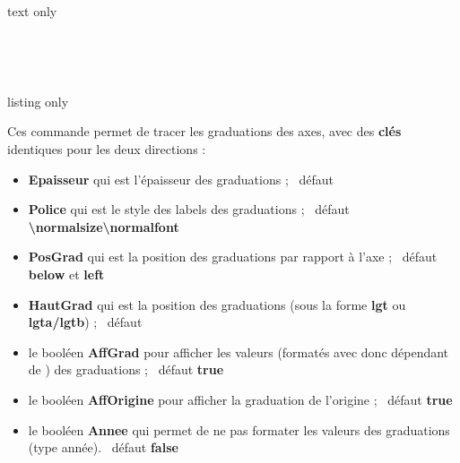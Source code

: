 \documentclass[a4paper,french,11pt]{article}
\newcommand\ctex[1]{\tcbox[vignettelatex]{#1}}
\newcommand\Cle[1]{{\bfseries\sffamily\textlangle #1\textrangle}}
\begin{document}
\begin{PresCodeSortiePL}{text only}
\hfill~
\begin{tikzpicture}%
	[x=0.3cm,y=0.06cm,%
	Ox=1992,xmin=1992,xmax=2012,xgrille=2,xgrilles=1,%
	Oy=1640,ymin=1640,ymax=1730,ygrille=10,ygrilles=5]
	\AxesTikz
\end{tikzpicture}
~~
\begin{tikzpicture}%
	[x=0.3cm,y=0.06cm,%
	Ox=1992,xmin=1992,xmax=2012,xgrille=2,xgrilles=1,%
	Oy=1640,ymin=1640,ymax=1730,ygrille=10,ygrilles=5]
	\AxesTikz%
		[AffLabel=xy,Labelx={Année},Labely={Altitude},%
		PosLabelx={below right},PosLabely={above left},%
		Police=\small\sffamily]
\end{tikzpicture}
\hfill~
\end{PresCodeSortiePL}


\begin{PresCodeTexPL}{listing only}
\end{PresCodeTexPL}

\begin{cautionblock}
Ces commande permet de tracer les graduations des axes, avec des \Cle{clés} identiques pour les deux directions :

\begin{itemize}
	\item \Cle{Epaisseur} qui est l'épaisseur des graduations ; \hfill~défaut \Cle{1pt}
	\item \Cle{Police} qui est le style des labels des graduations ; \hfill~défaut \Cle{\textbackslash{}normalsize\textbackslash{}normalfont}
	\item \Cle{PosGrad} qui est la position des graduations par rapport à l'axe ; \hfill~défaut \Cle{below} et \Cle{left}
	\item \Cle{HautGrad} qui est la position des graduations (sous la forme \Cle{lgt} ou \Cle{lgta/lgtb}) ; \hfill~défaut \Cle{4pt}
	\item le booléen \Cle{AffGrad} pour afficher les valeurs (formatés avec \ctex{num} donc dépendant de \ctex{sisetup}) des graduations  ; \hfill~défaut \Cle{true}
	\item le booléen \Cle{AffOrigine} pour afficher la graduation de l'origine ; \hfill~défaut \Cle{true}
	\item le booléen \Cle{Annee} qui permet de ne pas formater les valeurs des graduations (type \textsf{année}). \hfill~défaut \Cle{false}
\end{itemize}
\vspace*{-\baselineskip}\leavevmode
\end{cautionblock}
\end{document}
